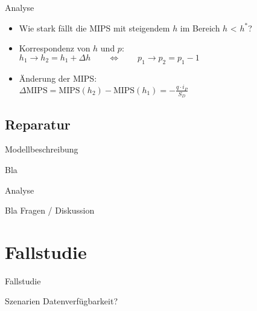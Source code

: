 \documentclass[beamer]{beamer}
\begin{document}
	\begin{frame}{Analyse}		
		\begin{itemize}
			\item<1-> Wie stark fällt die MIPS mit steigendem $h$ im Bereich $h$ < $h^*$?
			\item<2-> Korrespondenz von $h$ und $p$: \\ $h_1 \rightarrow h_2 = h_1 + \Delta h \qquad \Leftrightarrow \qquad p_1 \rightarrow p_2 = p_1 -1$
			\item<3-> Änderung der MIPS: \\ $\Delta \text{MIPS} = \text{MIPS}(h_2) - \text{MIPS}(h_1) = - \frac{q \cdot i_P}{S_D}$
		\end{itemize}
		\begin{center}
			\resizebox{0.5\linewidth}{!}{
				
			}
		\end{center}
	\end{frame}
	
\subsection{Reparatur}
\frame{\subsectionpage}
	\begin{frame}{Modellbeschreibung}
		\begin{center}
			Bla
		\end{center}
	\end{frame}
	
	\begin{frame}{Analyse}
		\begin{center}
			Bla
			Fragen / Diskussion
		\end{center}
	\end{frame}

\section{Fallstudie}
	\begin{frame}{Fallstudie}
		\begin{center}
			Szenarien
			Datenverfügbarkeit?
		\end{center}
	\end{frame}
\end{document}
